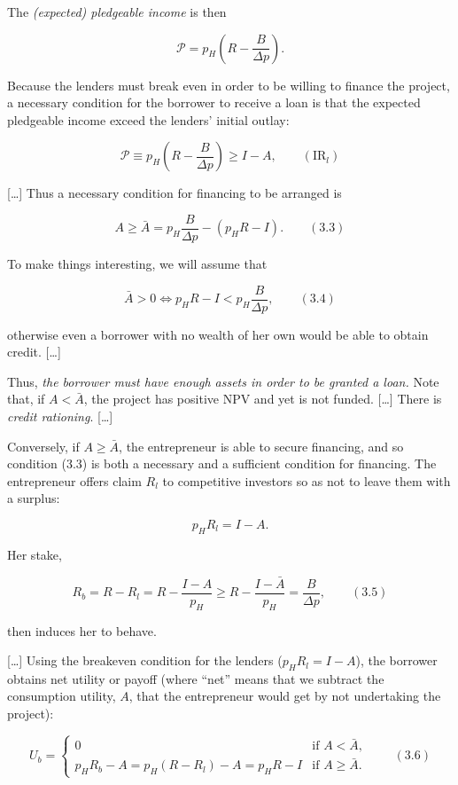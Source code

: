 \documentclass[11pt,a4paper]{article}
\begin{document}
The \emph{(expected) pledgeable income} is then

\[\mathcal{P} = p_H\left(R - \frac{B}{\Delta p}\right).\]

Because the lenders must break even in order to be willing to finance the project, a necessary
condition for the borrower to receive a loan is that the expected pledgeable income exceed the
lenders' initial outlay:

\[\mathcal{P} \equiv p_H\left(R - \frac{B}{\Delta p}\right) \geqslant I - A, \qquad (\text{IR}_l)\]

{[}\ldots{]} Thus a necessary condition for financing to be arranged is

\[A \geqslant \bar A = p_H \frac{B}{\Delta p} - (p_H R - I). \qquad (3.3)\]

To make things interesting, we will assume that

\[\bar A > 0 \iff p_H R - I < p_H \frac{B}{\Delta p}, \qquad (3.4)\]

otherwise even a borrower with no wealth of her own would be able to obtain credit. {[}\ldots{]}

Thus, \emph{the borrower must have enough assets in order to be granted a loan.} Note that, if
\(A < \bar A\), the project has positive NPV and yet is not funded. {[}\ldots{]} There is
\emph{credit rationing}. {[}\ldots{]}

Conversely, if \(A \geqslant \bar A\), the entrepreneur is able to secure financing, and so
condition (3.3) is both a necessary and a sufficient condition for financing. The entrepreneur
offers claim \(R_l\) to competitive investors so as not to leave them with a surplus:

\[p_H R_l = I - A.\]

Her stake,

\[R_b = R - R_l = R - \frac{I - A}{p_H} \geqslant R - \frac{I - \bar A}{p_H} = \frac{B}{\Delta p}, \qquad (3.5)\]

then induces her to behave.

{[}\ldots{]} Using the breakeven condition for the lenders (\(p_H R_l = I - A\)), the borrower
obtains net utility or payoff (where ``net'' means that we subtract the consumption utility, \(A\),
that the entrepreneur would get by not undertaking the project):

\[U_b = \begin{cases} 0 & \text{if } A < \bar A, \\ p_H R_b - A = p_H(R - R_l) - A = p_H R - I & \text{if } A \geqslant \bar A. \end{cases} \qquad (3.6)\]
\end{document}
